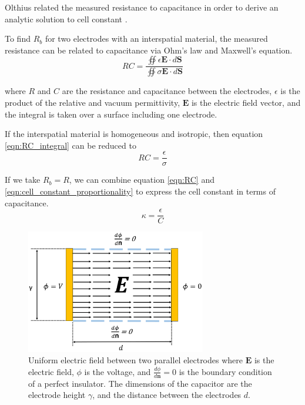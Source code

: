   \noindent  Olthius related the measured resistance to capacitance in order to derive an analytic solution to cell constant \cite{olthuis_theoretical_1995}. 
  
  \par To find $R_b$ for two electrodes with an interspatial material, the measured resistance can be related to capacitance via Ohm's law and Maxwell's equation.
  \begin{equation}
      RC = \frac{\oiint \epsilon \boldsymbol{E} \cdot d\boldsymbol{S}}{\oiint \sigma\boldsymbol{E}\cdot d\boldsymbol{S}}
      \label{eqn:RC_integral}
  \end{equation}
  
  \noindent where $R$ and $C$ are the resistance and capacitance between the electrodes, $\epsilon$ is the product of the relative and vacuum permittivity, $\boldsymbol{E}$ is the electric field vector, and the integral is taken over a surface including one electrode.
  
  \par If the interspatial material is homogeneous and isotropic, then equation \ref{eqn:RC_integral} can be reduced to
  \begin{equation}
      RC = \frac{\epsilon}{\sigma}
      \label{eqn:RC}
  \end{equation}
  
  \par If we take $R_b = R$, we can combine equation \ref{eqn:RC} and \ref{eqn:cell_constant_proportionality} to express the cell constant in terms of capacitance.
  \begin{equation}
      \kappa = \frac{\epsilon}{C}
      \label{eqn:cell_constant_C}
  \end{equation}
  
   \begin{figure}[ht]
  \centering
  \includegraphics[width=0.7\textwidth]{images/capacitorNoFringe.png}
  \caption[Uniform electric field between parallel plates]{Uniform electric field between two parallel electrodes where $\boldsymbol{E}$ is the electric field, $\phi$ is the voltage, and $\frac{d\phi}{d\boldsymbol{n}}=0$ is the boundary condition of a perfect insulator. The dimensions of the capacitor are the electrode height $\gamma$, and the distance between the electrodes $d$.}
  \label{fig:parallel_capacitor}
  \end{figure}
  
